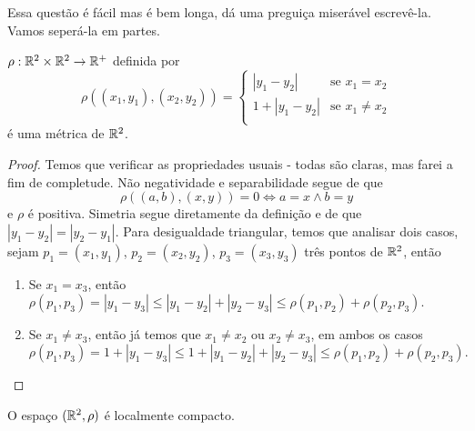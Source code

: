 \begin{problem}
    \label{prob:l4:4}
\end{problem}
Essa questão é fácil mas é bem longa, dá uma preguiça miserável escrevê-la. Vamos seperá-la em partes.
\begin{prop}
    $\rho : \mathbb{R}^2 \times \mathbb{R}^2 \rightarrow \mathbb{R}^+$ definida por
    $$\rho((x_1, y_1) , (x_2,y_2)) = \begin{cases}
        |y_1 - y_2| & \text{se } x_1 = x_2\\
        1 + |y_1 - y_2| & \text{se } x_1 \neq x_2\\
    \end{cases}$$
    é uma métrica de $\mathbb{R}^2$.
\end{prop}
\begin{proof}
    Temos que verificar as propriedades usuais - todas são claras, mas farei a fim de completude. 
    Não negatividade e separabilidade segue de que 
    $$\rho((a,b),(x,y)) = 0 \iff a = x \land b = y$$
    e $\rho$ é positiva. Simetria segue diretamente da definição e de que $|y_1 - y_2| = |y_2 - y_1|$. Para desigualdade 
    triangular, temos que analisar dois casos, sejam $p_1 = (x_1,y_1)$, $p_2 = (x_2,y_2)$, $p_3 = (x_3,y_3)$ três pontos de $\mathbb{R}^2$, então
    \begin{enumerate}
        \item Se $x_1 = x_3$, então $\rho(p_1,p_3) = |y_1 - y_3| \leq |y_1 - y_2| + |y_2 - y_3| \leq \rho(p_1,p_2) + \rho(p_2,p_3)$.
        \item Se $x_1 \neq x_3$, então já temos que $x_1 \neq x_2$ ou $x_2 \neq x_3$, em ambos os casos
        $$\rho(p_1,p_3) = 1 + |y_1 - y_3| \leq 1 + |y_1 - y_2| + |y_2 - y_3| \leq \rho(p_1,p_2) + \rho(p_2,p_3).$$ 
    \end{enumerate}
\end{proof}
\begin{prop}
    O espaço $(\mathbb{R}^2, \rho)$ é localmente compacto.
\end{prop}
